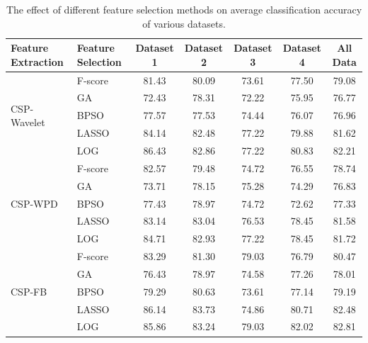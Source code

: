 \begin{table}[htbp]
\centering
\small
\caption{The effect of different feature selection methods on average classification accuracy of various datasets.}
\label{tab:table8_feature_selection}
\begin{tabular}{llccccc}
\toprule
\textbf{Feature Extraction} & \textbf{Feature Selection} & \textbf{Dataset 1} & \textbf{Dataset 2} & \textbf{Dataset 3} & \textbf{Dataset 4} & \textbf{All Data} \\
\midrule
\multirow{5}{*}{CSP-Wavelet} & F-score & 81.43 & 80.09 & 73.61 & 77.50 & 79.08 \\
 & GA & 72.43 & 78.31 & 72.22 & 75.95 & 76.77 \\
 & BPSO & 77.57 & 77.53 & 74.44 & 76.07 & 76.96 \\
 & LASSO & 84.14 & 82.48 & 77.22 & 79.88 & 81.62 \\
 & LOG & 86.43 & 82.86 & 77.22 & 80.83 & 82.21 \\
\midrule
\multirow{5}{*}{CSP-WPD} & F-score & 82.57 & 79.48 & 74.72 & 76.55 & 78.74 \\
 & GA & 73.71 & 78.15 & 75.28 & 74.29 & 76.83 \\
 & BPSO & 77.43 & 78.97 & 74.72 & 72.62 & 77.33 \\
 & LASSO & 83.14 & 83.04 & 76.53 & 78.45 & 81.58 \\
 & LOG & 84.71 & 82.93 & 77.22 & 78.45 & 81.72 \\
\midrule
\multirow{5}{*}{CSP-FB} & F-score & 83.29 & 81.30 & 79.03 & 76.79 & 80.47 \\
 & GA & 76.43 & 78.97 & 74.58 & 77.26 & 78.01 \\
 & BPSO & 79.29 & 80.63 & 73.61 & 77.14 & 79.19 \\
 & LASSO & 86.14 & 83.73 & 74.86 & 80.71 & 82.48 \\
 & LOG & 85.86 & 83.24 & 79.03 & 82.02 & 82.81 \\
\bottomrule
\end{tabular}
\end{table}

